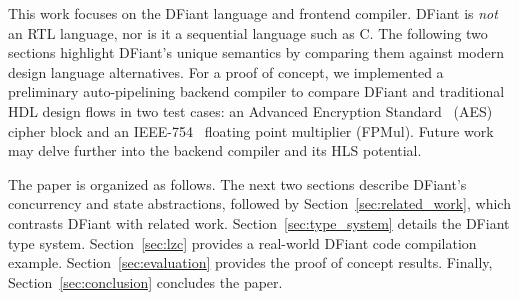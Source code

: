 This work focuses on the DFiant language and frontend compiler. DFiant is \emph{not} an RTL language, nor is it a sequential language such as C. The following two sections highlight DFiant's unique semantics by comparing them against modern design language alternatives. For a proof of concept, we implemented a preliminary auto-pipelining backend compiler to compare DFiant and traditional HDL design flows in two test cases: an Advanced Encryption Standard~\cite{pub2001197} (AES) cipher block and an IEEE-754~\cite{IEEE2008} floating point multiplier (FPMul). Future work may delve further into the backend compiler and its HLS potential.


The paper is organized as follows. The next two sections describe DFiant's concurrency and state abstractions, followed by Section~\ref{sec:related_work}, which contrasts DFiant with related work. 
Section~\ref{sec:type_system} details the DFiant type system.
Section~\ref{sec:lzc} provides a real-world DFiant code compilation example.
Section~\ref{sec:evaluation} provides the proof of concept results.
Finally, Section~\ref{sec:conclusion} concludes the paper.




 





